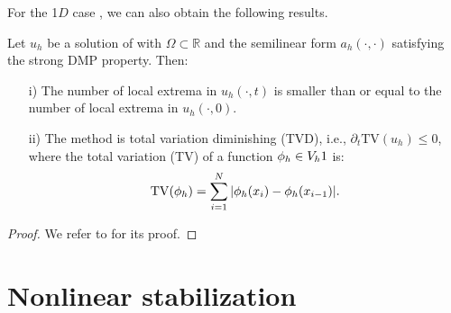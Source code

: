 For the 1$D$ case%
, we can also obtain the following results.%
\begin{lemma}
\label{lem-33}
Let $u_h$ be a solution of  with $\Omega\subset \mathbb{R}$ and the semilinear form $a_h(\cdot,\cdot)$ satisfying the strong DMP property. Then:
\begin{enumerate} 
\item[i)] The number of local extrema in $u_h(\cdot,t)$ is smaller than or equal to the number of local extrema in $u_h(\cdot,0)$.
\item[ii)] The method is total variation diminishing (TVD), i.e., $\partial_t \textrm{TV}(u_h) \leq 0$, where  the total variation (TV) of a function $\phi_h\in V_h1$ is:
\begin{equation*}
{\rm TV}(\phi_h) =  \sum_{i=1}^N |\phi_h(x_i)-\phi_h(x_{i-1})|.
\end{equation*}
\end{enumerate}
\end{lemma}
\begin{proof}
We refer to \cite[Lemmata 3.3-3.4]{burman_nonlinear_2007} for its proof.
\end{proof}

\section{Nonlinear stabilization}\label{s-nonstab}

